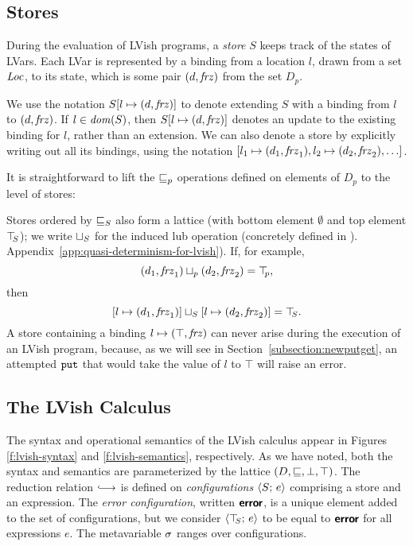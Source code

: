 \subsection{Stores}

During the evaluation of LVish programs, a \emph{store} $S$ keeps
track of the states of LVars.  Each LVar is represented by a binding
from a location $l$, drawn from a set $\mathit{Loc}$, to its state, which is
some pair $(d, \mathit{frz})$ from the set $D_p$.

\DefStore

\noindent We use the notation $S[l \mapsto (d, \mathit{frz})]$ to denote
extending $S$ with a binding from $l$ to $(d, \mathit{frz})$.  If $l \in
\mathit{dom}(S)$, then $S[l \mapsto (d, \mathit{frz})]$ denotes an update to the
existing binding for $l$, rather than an extension.  We can also
denote a store by explicitly writing out all its bindings, using the
notation $\store{\storebinding{l_1}{d_1}{\status_1},
  \storebinding{l_2}{d_2}{\status_2}, \dots}$.

It is straightforward to lift the $\sqsubseteq_p$ operations
defined on elements of $D_p$ to the level of stores:

\DefLeqStore


\noindent
Stores ordered by $ \sqsubseteq_S $ also form a lattice (with bottom element
$\emptyset$ and top element $\top\hspace{-0.85mm}_{S}$); we write $ \sqcup_{S} $ for the induced
lub operation (concretely defined in 
\ifx\fulltr\undefined
\cite{Freeze-TR}).
\else
Appendix~\ref{app:quasi-determinism-for-lvish}).
\fi
If, for example,
\[ (d_1, \mathit{frz}_1) \sqcup_p (d_2, \mathit{frz}_2) = \top\hspace{-0.85mm}_{p}, \]
then
\[ \left[ l \mapsto (d_1, \mathit{frz}_1) \right] \sqcup_{S} \left[ l \mapsto (d_2, \mathit{frz}_2) \right] =
\top\hspace{-0.85mm}_{S}. \] 
A store containing a binding $l \mapsto (\top, \mathit{frz})$ can
never arise during the execution of an LVish program, because, as we will see
in Section~\ref{subsection:newputget}, an attempted $\mbox{\texttt{put}}$ that would take the
value of $l$ to $\top$ will raise an error.

\subsection{The LVish Calculus}

\FigLambdaLVishGrammar[t]

\FigLambdaLVishSemantics[t]

The syntax and operational semantics of the LVish calculus appear in Figures
\ref{f:lvish-syntax} and \ref{f:lvish-semantics}, respectively.  As we
have noted, both the syntax and semantics are parameterized by the
lattice $(D, \sqsubseteq, \bot, \top)$.  The reduction relation $\parstepsto$ is
defined on \emph{configurations} $\langle S;\, e \rangle$ comprising a store
and an expression.  The \emph{error configuration}, written $\textbf{\textsf{error}}$,
is a unique element added to the set of configurations, but we
consider $\langle \top\hspace{-0.85mm}_{S};\, e \rangle$ to be equal to $\textbf{\textsf{error}}$ for all
expressions $e$.  The metavariable $\sigma$ ranges over configurations.

